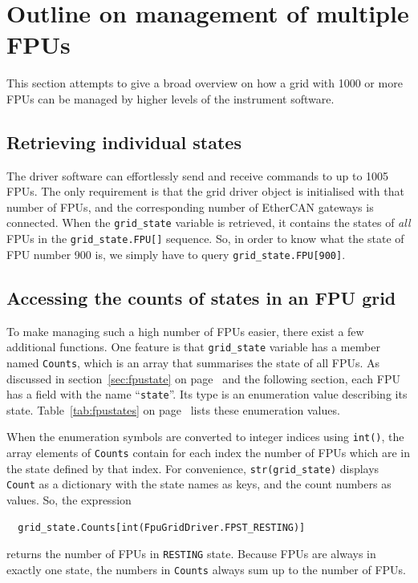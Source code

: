 \documentclass[11pt,a4paper]{scrartcl}
\begin{document}
\section{Outline on management of multiple FPUs}
This section attempts to give a broad overview on how a grid with 1000
or more FPUs can be managed by higher levels of the instrument
software.

\subsection{Retrieving individual states}
The driver software can effortlessly send and receive commands to up
to 1005 FPUs. The only requirement is that the grid driver object is
initialised with that number of FPUs, and the corresponding number of
EtherCAN gateways is connected. When the \texttt{grid\_state} variable
is retrieved, it contains the states of \emph{all} FPUs in the
\verb+grid_state.FPU[]+ sequence. So, in order to know what the state
of FPU number 900 is, we simply have to query
\verb+grid_state.FPU[900]+.

\subsection{Accessing the counts of states in an FPU grid}
To make managing such a high number of FPUs easier, there exist a few
additional functions. One feature is that \texttt{grid\_state}
variable has a member named \texttt{Counts}, which is an array that
summarises the state of all FPUs. As discussed in
section~\ref{sec:fpustate} on page~\pageref{sec:fpustate} and the
following section, each FPU has a field with the name
``\texttt{state}''. Its type is an enumeration value describing its
state. Table~\ref{tab:fpustates} on page~\pageref{tab:fpustates} lists
these enumeration values.

When the enumeration symbols are converted to integer indices using
\texttt{int()}, the array elements of \texttt{Counts} contain for each
index the number of FPUs which are in the state defined by that
index. For convenience, \texttt{str(grid\_state)} displays
\texttt{Count} as a dictionary with the state names as keys, and the
count numbers as values. So, the expression
\begin{verbatim}
  grid_state.Counts[int(FpuGridDriver.FPST_RESTING)]
\end{verbatim}
returns the number of FPUs in \texttt{RESTING} state. Because FPUs are
always in exactly one state, the numbers in \texttt{Counts} always sum
up to the number of FPUs.
\end{document}

